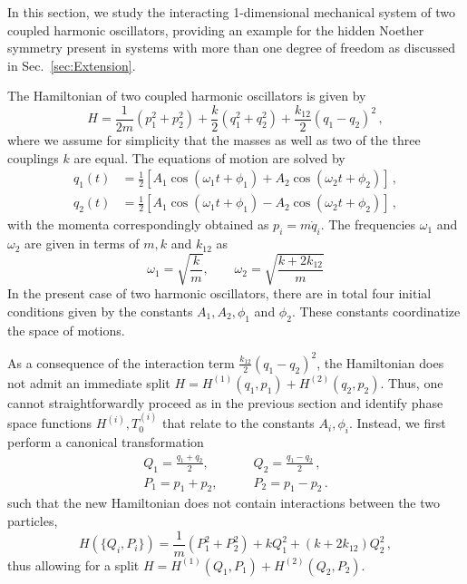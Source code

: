 \documentclass[twocolumn,notitlepage,superscriptaddress, nofootinbib,nobibnotes, aps,prd,10pt]{revtex4-1}%
\begin{document}
In this section, we study the interacting 1-dimensional mechanical system of two coupled harmonic oscillators, providing an example for the hidden Noether symmetry present in systems with more than one degree of freedom as discussed in Sec.~\ref{sec:Extension}. 

The Hamiltonian of two coupled harmonic oscillators is given by
%
\begin{equation}
H = \frac{1}{2m}\left(p_1^2+p_2^2\right)+\frac{k}{2}\left(q_1^2+q_2^2\right)+\frac{k_{12}}{2}(q_1-q_2)^2\, ,
\end{equation}
%
where we assume for simplicity that the masses as well as two of the three couplings $k$ are equal. The equations of motion are solved by
%
\begin{subequations}
\begin{align}
    q_1(t)&=\frac{1}{2}\left[A_1\cos(\omega_1 t+\phi_1)+A_2\cos(\omega_2 t+\phi_2)\right]\,, \\[7pt]
    q_2(t)&=\frac{1}{2}\left[A_1\cos(\omega_1 t+\phi_1)-A_2\cos(\omega_2 t+\phi_2)\right]\,,
\end{align}
\end{subequations}
%
with the momenta correspondingly obtained as $p_i = m\dot{q}_i$. The frequencies $\omega_1$ and $\omega_2$ are given in terms of $m,k$ and $k_{12}$ as
%
\begin{equation}
\omega_1 = \sqrt{\frac{k}{m}},\qquad \omega_2 = \sqrt{\frac{k+2k_{12}}{m}}
\end{equation}
%
In the present case of two harmonic oscillators, there are in total four initial conditions given by the constants $A_1,A_2,\phi_1$ and $\phi_2$. These constants coordinatize the space of motions.

As a consequence of the interaction term $\frac{k_{12}}{2}(q_1-q_2)^2$, the Hamiltonian does not admit an immediate split $H = H^{(1)}(q_1,p_1)+H^{(2)}(q_2,p_2)$. Thus, one cannot straightforwardly proceed as in the previous section and identify phase space functions $H^{(i)},T_0^{(i)}$ that relate to the constants $A_i,\phi_i$. Instead, we first perform a canonical transformation
%
\begin{subequations}
\begin{align}
  Q_1 = \frac{q_1+q_2}{2},\qquad & Q_2 = \frac{q_1-q_2}{2}\,,\\[7pt]
P_1 = p_1+p_2,\qquad & P_2 = p_1-p_2\,.  
\end{align}
\end{subequations}
%
such that the new Hamiltonian does not contain interactions between the two particles,
%
\begin{equation}
H(\{Q_i,P_i\}) = \frac{1}{m}\left(P_1^2+P_2^2\right)+kQ_1^2 + (k+2k_{12})Q_2^2\, , 
\end{equation}
%
thus allowing for a split $H = H^{(1)}(Q_1,P_1)+H^{(2)}(Q_2,P_2)$. 
\end{document}
